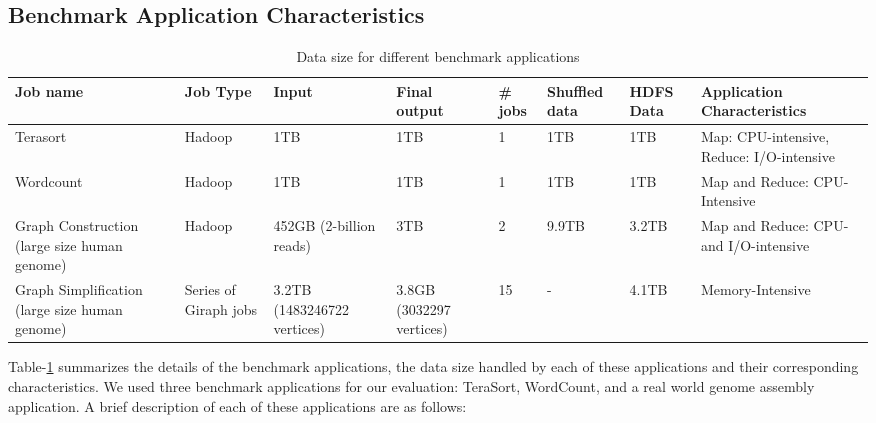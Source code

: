 \documentclass[journal]{IEEEtran}
\begin{document}
\subsection{Benchmark Application Characteristics}
\begin{table}
\caption{Data size for different benchmark applications}
\label{tab:AppChar}
\begin{center}
    \begin{tabular}{ |p{3cm} | p{1.5cm} | p{2.5cm} | p{2.5cm} | p{0.8cm} | p{0.8cm} | p{0.8cm} | p{2.5cm}|} \hline
     Job name & Job Type & Input & Final output & \# jobs & Shuffled data & HDFS Data & Application Characteristics \\ \hline
    Terasort & Hadoop & 1TB & 1TB & 1 & 1TB & 1TB & Map: CPU-intensive, Reduce: I/O-intensive \\ \hline
    Wordcount & Hadoop & 1TB & 1TB & 1 & 1TB & 1TB & Map and Reduce: CPU-Intensive \\ \hline 
    Graph Construction (large size human genome) & Hadoop & 452GB (2-billion reads) & 3TB & 2 & 9.9TB & 3.2TB &Map and Reduce: CPU- and I/O-intensive\\ \hline
    Graph Simplification (large size human genome) & Series of Giraph jobs & 3.2TB (1483246722 vertices) & 3.8GB (3032297 vertices) & 15 & - & 4.1TB & Memory-Intensive \\ \hline 
    \end{tabular}
\end{center}
\end{table}
Table-\ref{tab:AppChar} summarizes the details of the benchmark applications, the data size handled by each of these applications and their corresponding characteristics. We used three benchmark applications for our evaluation: TeraSort, WordCount, and a real world genome assembly application. A brief description of each of these applications are as follows:
\end{document}
